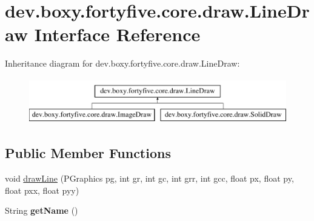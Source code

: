 \hypertarget{interfacedev_1_1boxy_1_1fortyfive_1_1core_1_1draw_1_1_line_draw}{
\section{dev.boxy.fortyfive.core.draw.LineDraw Interface Reference}
\label{d2/dd8/interfacedev_1_1boxy_1_1fortyfive_1_1core_1_1draw_1_1_line_draw}
}
Inheritance diagram for dev.boxy.fortyfive.core.draw.LineDraw:\begin{figure}[H]
\begin{center}
\leavevmode
\includegraphics[height=2.000000cm]{d2/dd8/interfacedev_1_1boxy_1_1fortyfive_1_1core_1_1draw_1_1_line_draw}
\end{center}
\end{figure}
\subsection*{Public Member Functions}
\begin{DoxyCompactItemize}
\item 
void \hyperlink{interfacedev_1_1boxy_1_1fortyfive_1_1core_1_1draw_1_1_line_draw_afe4c5db7c863e99691964dc7e7708a37}{drawLine} (PGraphics pg, int gr, int gc, int grr, int gcc, float px, float py, float pxx, float pyy)
\item 
\hypertarget{interfacedev_1_1boxy_1_1fortyfive_1_1core_1_1draw_1_1_line_draw_aee1524c1a05bbe8acadafc1c5653e325}{
String {\bfseries getName} ()}
\label{d2/dd8/interfacedev_1_1boxy_1_1fortyfive_1_1core_1_1draw_1_1_line_draw_aee1524c1a05bbe8acadafc1c5653e325}

\end{DoxyCompactItemize}


